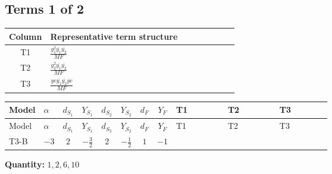 \documentclass[8pt]{article}
\begin{document}
\begin{landscape}
\subsection*{Terms 1 of 2}
\begin{center}
\begin{tabular}{@{}c >{\raggedright\arraybackslash}p{0.82\linewidth}@{}}
\toprule
Column & Representative term structure \\
\midrule
T1 & \(\displaystyle \frac{g_{1}^{2} \overline{y_{1}} \overline{y_{2}}}{MF}\) \\
\midrule
T2 & \(\displaystyle \frac{g_{2}^{2} \overline{y_{1}} \overline{y_{2}}}{MF}\) \\
\midrule
T3 & \(\displaystyle \frac{ye \overline{y_{1}} \overline{y_{2}} \overline{ye}}{MF}\) \\
\midrule
\bottomrule
\end{tabular}
\end{center}
\smallskip
\tiny
\begin{longtable}{@{}llcccccc >{\raggedright\arraybackslash}p{0.21\linewidth} >{\raggedright\arraybackslash}p{0.21\linewidth} >{\raggedright\arraybackslash}p{0.21\linewidth}@{}}
\toprule
Model & $\alpha$ & $d_{S_1}$ & $Y_{S_1}$ & $d_{S_2}$ & $Y_{S_2}$ & $d_F$ & $Y_F$ & T1 & T2 & T3 \\
\midrule
\endfirsthead
\toprule
Model & $\alpha$ & $d_{S_1}$ & $Y_{S_1}$ & $d_{S_2}$ & $Y_{S_2}$ & $d_F$ & $Y_F$ & T1 & T2 & T3 \\
\midrule
\endhead
T3-B & $-3$ & $2$ & $-\frac{3}{2}$ & $2$ & $-\frac{1}{2}$ & $1$ & $-1$ & \scriptsize\adjustbox{max width=\linewidth}{$\begin{gathered} \frac{3 g_{1}^{2} \overline{y_{1}} \overline{y_{2}}}{4 MF}\end{gathered}$} & \scriptsize\adjustbox{max width=\linewidth}{$\begin{gathered} \frac{3 g_{2}^{2} \overline{y_{1}} \overline{y_{2}}}{8 MF}\end{gathered}$} & \scriptsize\adjustbox{max width=\linewidth}{$\begin{gathered} - \frac{ye \overline{y_{1}} \overline{y_{2}} \overline{ye}}{8 MF}\end{gathered}$} \\
\midrule
\bottomrule
\end{longtable}
\clearpage
\noindent\textbf{Quantity: }$\mathrm{1,2,6,10}$\par\smallskip

\end{landscape}
\end{document}
